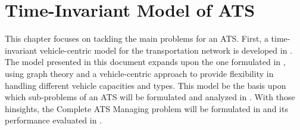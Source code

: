 \chapter{Time-Invariant Model of ATS}\label{ch:tim_ats}
This chapter focuses on tackling the main problems for an ATS. First, a time-invariant vehicle-centric model for the transportation network is developed in . The model presented in this document expands upon the one formulated in \cite{project_thesis}, using graph theory and a vehicle-centric approach to provide flexibility in handling different vehicle capacities and types. This model be the basis upon which sub-problems of an ATS will be formulated and analyzed in . With those hinsights, the Complete ATS Managing problem will be formulated in  and its performance evaluated in . 
